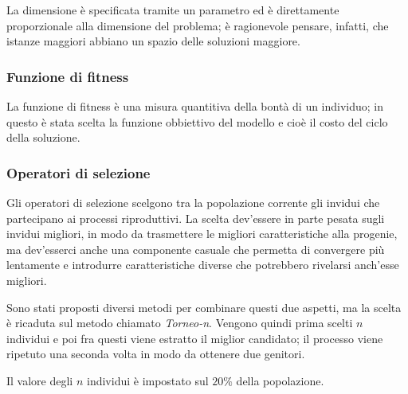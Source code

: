 La dimensione è specificata tramite un parametro ed è direttamente proporzionale alla dimensione del problema;
è ragionevole pensare, infatti, che istanze maggiori abbiano un spazio delle soluzioni maggiore.
\subsubsection{Funzione di fitness}\label{subsubsec:funzione-fitness}
La funzione di fitness è una misura quantitiva della bontà di un individuo;
in questo è stata scelta la funzione obbiettivo del modello e cioè il costo del ciclo della soluzione.
\subsubsection{Operatori di selezione}\label{subsubsec:operatori-selezione}
Gli operatori di selezione scelgono tra la popolazione corrente gli invidui che partecipano ai processi riproduttivi.
La scelta dev'essere in parte pesata sugli invidui migliori, in modo da trasmettere le migliori caratteristiche
alla progenie, ma dev'esserci anche una componente casuale che permetta di convergere più lentamente e introdurre caratteristiche
diverse che potrebbero rivelarsi anch'esse migliori.

Sono stati proposti diversi metodi per combinare questi due aspetti, ma la scelta è ricaduta sul metodo
chiamato \textit{Torneo-n}.
Vengono quindi prima scelti $n$ individui e poi fra questi viene estratto il miglior candidato; il processo viene ripetuto
una seconda volta in modo da ottenere due genitori.

Il valore degli $n$ individui è impostato sul $20\%$ della popolazione.
